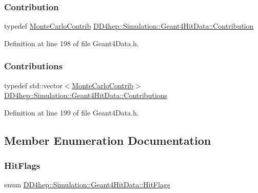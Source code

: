 \subsubsection{\texorpdfstring{Contribution}{Contribution}}
{\footnotesize\ttfamily typedef \hyperlink{class_d_d4hep_1_1_simulation_1_1_geant4_hit_data_1_1_monte_carlo_contrib}{Monte\+Carlo\+Contrib} \hyperlink{class_d_d4hep_1_1_simulation_1_1_geant4_hit_data_aec2f53237eac2db7d83dd03bca8719c5}{D\+D4hep\+::\+Simulation\+::\+Geant4\+Hit\+Data\+::\+Contribution}}



Definition at line 198 of file Geant4\+Data.\+h.

\hypertarget{class_d_d4hep_1_1_simulation_1_1_geant4_hit_data_aee3759a12612c2f2712e44f87e343a2f}{}\label{class_d_d4hep_1_1_simulation_1_1_geant4_hit_data_aee3759a12612c2f2712e44f87e343a2f} 
\subsubsection{\texorpdfstring{Contributions}{Contributions}}
{\footnotesize\ttfamily typedef std\+::vector$<$\hyperlink{class_d_d4hep_1_1_simulation_1_1_geant4_hit_data_1_1_monte_carlo_contrib}{Monte\+Carlo\+Contrib}$>$ \hyperlink{class_d_d4hep_1_1_simulation_1_1_geant4_hit_data_aee3759a12612c2f2712e44f87e343a2f}{D\+D4hep\+::\+Simulation\+::\+Geant4\+Hit\+Data\+::\+Contributions}}



Definition at line 199 of file Geant4\+Data.\+h.



\subsection{Member Enumeration Documentation}
\hypertarget{class_d_d4hep_1_1_simulation_1_1_geant4_hit_data_a2ae584db022f0919214459dffcaf41fc}{}\label{class_d_d4hep_1_1_simulation_1_1_geant4_hit_data_a2ae584db022f0919214459dffcaf41fc} 
\subsubsection{\texorpdfstring{Hit\+Flags}{HitFlags}}
{\footnotesize\ttfamily enum \hyperlink{class_d_d4hep_1_1_simulation_1_1_geant4_hit_data_a2ae584db022f0919214459dffcaf41fc}{D\+D4hep\+::\+Simulation\+::\+Geant4\+Hit\+Data\+::\+Hit\+Flags}}

